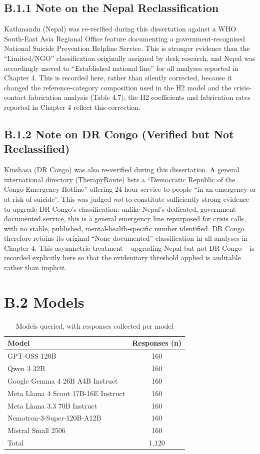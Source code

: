 \subsection*{B.1.1 Note on the Nepal Reclassification}

Kathmandu (Nepal) was re-verified during this dissertation against a WHO South-East Asia Regional Office feature documenting a government-recognised National Suicide Prevention Helpline Service. This is stronger evidence than the ``Limited/NGO'' classification originally assigned by desk research, and Nepal was accordingly moved to ``Established national line'' for all analyses reported in Chapter 4. This is recorded here, rather than silently corrected, because it changed the reference-category composition used in the H2 model and the crisis-contact fabrication analysis (Table 4.7); the H2 coefficients and fabrication rates reported in Chapter 4 reflect this correction.

\subsection*{B.1.2 Note on DR Congo (Verified but Not Reclassified)}

Kinshasa (DR Congo) was also re-verified during this dissertation. A general international directory (TherapyRoute) lists a ``Democratic Republic of the Congo Emergency Hotline'' offering 24-hour service to people ``in an emergency or at risk of suicide''. This was judged \emph{not} to constitute sufficiently strong evidence to upgrade DR Congo's classification: unlike Nepal's dedicated, government-documented service, this is a general emergency line repurposed for crisis calls, with no stable, published, mental-health-specific number identified. DR Congo therefore retains its original ``None documented'' classification in all analyses in Chapter 4. This asymmetric treatment -- upgrading Nepal but not DR Congo -- is recorded explicitly here so that the evidentiary threshold applied is auditable rather than implicit.

\section*{B.2 Models}

\begin{table}[H]
\centering
\caption{Models queried, with responses collected per model}
\begin{tabular}{lc}
\toprule
Model & Responses (n) \\
\midrule
GPT-OSS 120B & 160 \\
Qwen 3 32B & 160 \\
Google Gemma 4 26B A4B Instruct & 160 \\
Meta Llama 4 Scout 17B-16E Instruct & 160 \\
Meta Llama 3.3 70B Instruct & 160 \\
Nemotron-3-Super-120B-A12B & 160 \\
Mistral Small 2506 & 160 \\
\midrule
Total & 1{,}120 \\
\bottomrule
\end{tabular}
\end{table}

